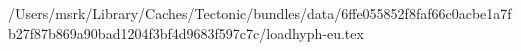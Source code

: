 /Users/msrk/Library/Caches/Tectonic/bundles/data/6ffe055852f8faf66c0acbe1a7fb27f87b869a90bad1204f3bf4d9683f597c7c/loadhyph-eu.tex